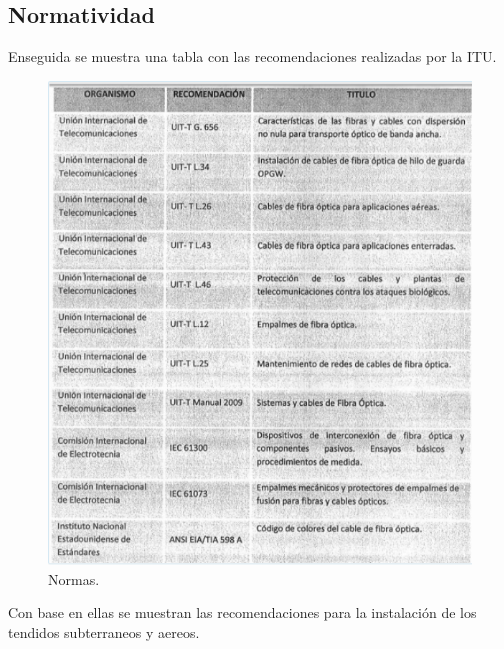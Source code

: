\documentclass[12pt,letterpaper]{article}
\begin{document}
\subsection{Normatividad}
Enseguida se muestra una tabla con las recomendaciones realizadas por la ITU.
\begin{figure}[ht]
    \centering
    \includegraphics[width=.7\textwidth]{imagenes/norm.PNG}
    \caption{Normas.}
\end{figure}

Con base en ellas se muestran las recomendaciones para la instalación de los tendidos 
subterraneos y aereos.
\end{document}
